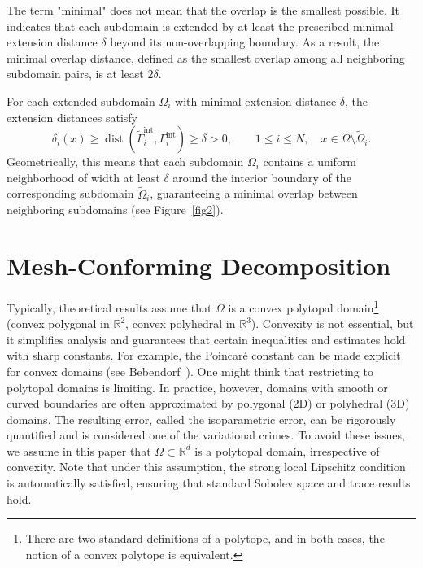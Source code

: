 \begin{remark}
The term "minimal" does not mean that the overlap is the smallest possible. It indicates that each subdomain is extended by at least the prescribed minimal 
extension distance $\delta$ beyond its non-overlapping boundary. As a result, the minimal overlap distance, defined as the smallest overlap among all neighboring 
subdomain pairs, is at least $2\delta$. 

\vspace{6pt}
\noindent For each extended subdomain $\Omega_i$ with minimal extension distance $\delta$, the extension distances satisfy
\begin{equation*}
    \delta_i(x) \ge \operatorname{dist}(\widetilde{\Gamma}_i^{\text{int}}, \Gamma_i^{\text{int}}) \geq \delta>0, 
    \qquad 1 \leq i \leq N, \quad x \in \Omega \setminus \widetilde{\Omega}_i.
\end{equation*}
Geometrically, this means that each subdomain $\Omega_i$ contains a uniform neighborhood of width at least $\delta$ around the interior boundary of the 
corresponding subdomain $\widetilde{\Omega}_i$, guaranteeing a minimal overlap between neighboring subdomains (see Figure~\ref{fig2}).
\end{remark}

\section{Mesh-Conforming Decomposition}

Typically, theoretical results assume that $\Omega$ is a convex polytopal domain\footnote{There are two standard definitions of a polytope, and in both cases, the notion of a convex polytope is equivalent.} (convex polygonal in $\mathbb{R}^{2}$, convex polyhedral in $\mathbb{R}^{3}$). Convexity is not essential, but it simplifies analysis and guarantees that certain inequalities and estimates hold with sharp constants. For example, the Poincaré constant can be made explicit for convex domains (see Bebendorf~\cite{Bebendorf2003Poincare}). One might think that restricting to polytopal domains is limiting. In practice, however, domains with smooth or curved boundaries are often approximated by polygonal (2D) or polyhedral (3D) domains. The resulting error, called the isoparametric error, can be rigorously quantified and is considered one of the variational crimes. To avoid these issues, we assume in this paper that $\Omega \subset \mathbb{R}^{d}$ is a polytopal domain, irrespective of convexity. Note that under this assumption, the strong local Lipschitz condition is automatically satisfied, ensuring that standard Sobolev space and trace results hold.

